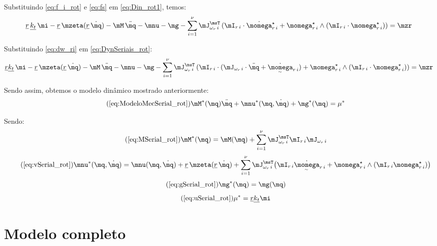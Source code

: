 \documentclass[]{politex}
\begin{document}
Substituindo \eqref{eq:f_i_rot} e \eqref{eq:fs} em  \eqref{eq:Din_rot1}, temos:
\begin{equation} \label{eq:DynSeriais_rot}
\underline{r} \, \underline{k_t} \, \mi - \underline{r} \, \mzeta(\underline{r} \, \dot{\mq}) - \mM \, \ddot{\mq} - \mnu - \mg  - \sum_{i=1}^\nu \mJ_{\omega_r \,i}^\msT \, ( \mI_{r\,i} \cdot \dot{\momega}_{r\,i}^\star + \momega_{r\,i}^\star \wedge (\mI_{r\,i} \cdot \momega_{r\,i}^\star)  )  = \mzr
\end{equation}

Substituindo \eqref{eq:dw_ri} em \eqref{eq:DynSeriais_rot}:
\begin{equation} \label{eq:DynSeriais_rot2}
\underline{r} \underline{k_t} \, \mi - \underline{r} \, \mzeta(\underline{r} \, \dot{\mq})  - \mM \, \ddot{\mq} - \mnu - \mg  - \sum_{i=1}^\nu \mJ_{\omega_r \,i}^\msT \, ( \mI_{r\,i} \cdot (\mJ_{\omega_r \,i}  \cdot \ddot{\mq} + \underaccent{\sim}{\dot{\momega}}_{r\,i}  ) + \momega_{r\,i}^\star \wedge (\mI_{r\,i} \cdot \momega_{r\,i}^\star)  )  = \mzr
\end{equation}

Sendo assim, obtemos o modelo dinâmico mostrado anteriormente:
\begin{equation} \tag{\ref{eq:ModeloMecSerial_rot}}
\mM^*(\mq) \ddot{\mq} + \mnu^*(\mq,\dot{\mq}) + \mg^*(\mq) = \mu^*
\end{equation}

Sendo:
\begin{equation} \tag{\ref{eq:MSerial_rot}}
\mM^*(\mq) = \mM(\mq) + \sum_{i=1}^\nu \mJ_{\omega_r \,i}^\msT \mI_{r\,i} \mJ_{\omega_r \,i}
\end{equation}
\begin{equation} \tag{\ref{eq:vSerial_rot}}
\mnu^*(\mq, \dot{\mq}) = \mnu(\mq, \dot{\mq}) + \underline{r} \, \mzeta(\underline{r} \, \dot{\mq}) + \sum_{i=1}^\nu
 \mJ_{\omega_r \,i}^\msT \big( \mI_{r\,i} \underaccent{\sim}{\dot{\momega}}_{r\,i} + \momega^\star_{r\,i} \wedge (\mI_{r\,i} \momega^\star_{r\,i}) \big)
\end{equation}
\begin{equation} \tag{\ref{eq:gSerial_rot}}
\mg^*(\mq) = \mg(\mq)
\end{equation}
\begin{equation} \tag{\ref{eq:uSerial_rot}}
\mu^* = \underline{r} \underline{k_t} \mi
\end{equation}

\section{Modelo completo}
\end{document}
